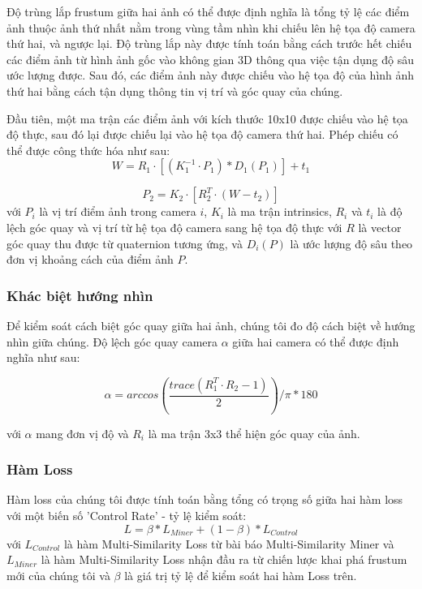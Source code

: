 Độ trùng lắp frustum giữa hai ảnh có thể được định nghĩa là tổng tỷ lệ các điểm ảnh thuộc ảnh thứ nhất nằm trong vùng tầm nhìn khi chiếu lên hệ tọa độ camera thứ hai, và ngược lại. Độ trùng lắp này được tính toán bằng cách trước hết chiếu các điểm ảnh từ hình ảnh gốc vào không gian 3D thông qua việc tận dụng độ sâu ước lượng được. Sau đó, các điểm ảnh này được chiếu vào hệ tọa độ của hình ảnh thứ hai bằng cách tận dụng thông tin vị trí và góc quay của chúng.

Đầu tiên, một ma trận các điểm ảnh với kích thước 10x10 được chiếu vào hệ tọa độ thực, sau đó lại được chiếu lại vào hệ tọa độ camera thứ hai. Phép chiếu có thể được công thức hóa như sau:
$$
W = R_1\cdot \left[(K_1^{-1} \cdot P_1)*D_1(P_1)\right] + t_1
$$

$$
P_2 = K_2 \cdot\left[R_2^{T} \cdot (W - t_2)\right]
$$
với $P_i$ là vị trí điểm ảnh trong camera $i$, $K_i$ là ma trận intrinsics, $R_i$ và $t_i$ là độ lệch góc quay và vị trí từ hệ tọa độ camera sang hệ tọa độ thực với $R$ là vector góc quay thu được từ quaternion tương ứng, và $D_i(P)$ là ước lượng độ sâu theo đơn vị khoảng cách của điểm ảnh $P$.

\subsubsection*{Khác biệt hướng nhìn}

Để kiểm soát cách biệt góc quay giữa hai ảnh, chúng tôi đo độ cách biệt về hướng nhìn giữa chúng. Độ lệch góc quay camera $\alpha$ giữa hai camera có thể được định nghĩa như sau:

$$
\alpha = arccos\left(\frac{trace(R_1^T \cdot R_2 - 1)}{2} \right) / \pi * 180
$$

với $\alpha$ mang đơn vị độ và $R_i$ là ma trận 3x3 thể hiện góc quay của ảnh.

\subsubsection*{Hàm Loss}

Hàm loss của chúng tôi được tính toán bằng tổng có trọng số giữa hai hàm loss với một biến số 'Control Rate' - tỷ lệ kiểm soát:
$$
L = \beta * L_{Miner} + (1-\beta)*L_{Control}
$$
với $L_{Control}$ là hàm Multi-Similarity Loss từ bài báo Multi-Similarity Miner và $L_{Miner}$ là hàm Multi-Similarity Loss nhận đầu ra từ chiến lược khai phá frustum mới của chúng tôi và $\beta$ là giá trị tỷ lệ để kiểm soát hai hàm Loss trên.

